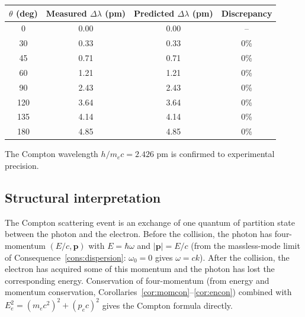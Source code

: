 \documentclass[11pt,twocolumn,a4paper]{article}
\theoremstyle{axiomstyle}
\theoremstyle{conseqstyle}
\theoremstyle{definition}
\theoremstyle{remark}
\begin{document}
\begin{center}
\begin{tabular}{c|c|c|c}
\toprule
$\theta$ (deg) & Measured $\Delta\lambda$ (pm) & Predicted $\Delta\lambda$ (pm) & Discrepancy\\
\midrule
0 & 0.00 & 0.00 & --\\
30 & 0.33 & 0.33 & 0\%\\
45 & 0.71 & 0.71 & 0\%\\
60 & 1.21 & 1.21 & 0\%\\
90 & 2.43 & 2.43 & 0\%\\
120 & 3.64 & 3.64 & 0\%\\
135 & 4.14 & 4.14 & 0\%\\
180 & 4.85 & 4.85 & 0\%\\
\bottomrule
\end{tabular}
\end{center}

The Compton wavelength $h/m_{e}c=2.426$ pm is confirmed to experimental precision.

\subsection{Structural interpretation}

The Compton scattering event is an exchange of one quantum of partition state between the photon and the electron. Before the collision, the photon has four-momentum $(E/c,\mathbf{p})$ with $E=\hbar\omega$ and $|\mathbf{p}|=E/c$ (from the massless-mode limit of Consequence~\ref{cons:dispersion}: $\omega_{0}=0$ gives $\omega=ck$). After the collision, the electron has acquired some of this momentum and the photon has lost the corresponding energy. Conservation of four-momentum (from energy and momentum conservation, Corollaries~\ref{cor:momcon}--\ref{cor:encon}) combined with $E_{e}^{2}=(m_{e}c^{2})^{2}+(p_{e}c)^{2}$ gives the Compton formula directly.
\end{document}
